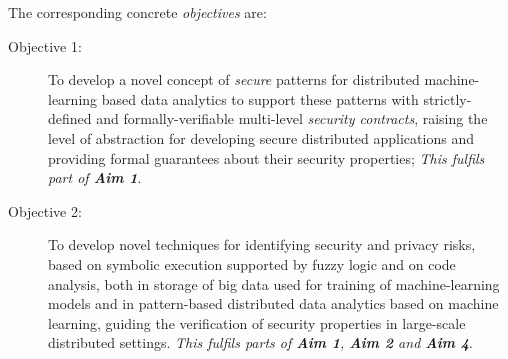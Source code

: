 \documentclass[a4paper,11pt]{article}
\begin{document}
The corresponding concrete \emph{objectives} are: 
\begin{description}

 
\item[Objective 1:] To develop a novel concept of \emph{secure} patterns for distributed machine-learning based data analytics to support these
patterns with strictly-defined and formally-verifiable multi-level \emph{security contracts}, raising the level of abstraction
for developing secure distributed applications and providing formal guarantees about their security properties; 
\emph{This fulfils part of \textbf{Aim 1}}. 

\item[Objective 2:] To develop novel techniques for identifying security and privacy risks, based on symbolic execution supported by fuzzy logic and on code analysis, both in storage of big data used for training of machine-learning models and in pattern-based distributed data analytics based on machine learning, guiding the verification of security properties in large-scale distributed settings. \emph{This fulfils parts of \textbf{Aim 1}, \textbf{Aim 2} and \textbf{Aim 4}}.
  

\end{description}
\end{document}
